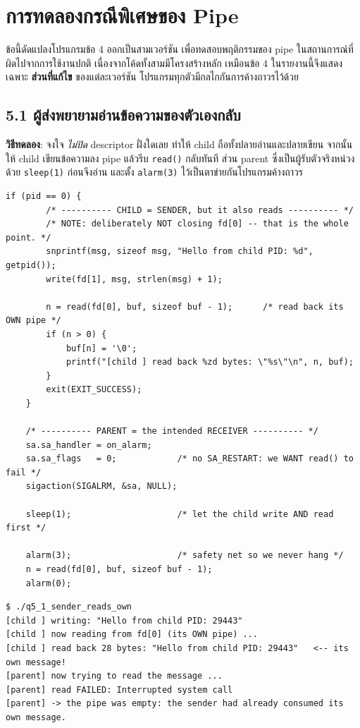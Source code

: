 \documentclass[a4paper,12pt]{article}
\newcommand{\code}[1]{\texttt{#1}}
\begin{document}
\section{การทดลองกรณีพิเศษของ Pipe}

ข้อนี้ดัดแปลงโปรแกรมข้อ 4 ออกเป็นสามเวอร์ชัน เพื่อทดสอบพฤติกรรมของ pipe
ในสถานการณ์ที่ผิดไปจากการใช้งานปกติ เนื่องจากโค้ดทั้งสามมีโครงสร้างหลัก
เหมือนข้อ 4 ในรายงานนี้จึงแสดงเฉพาะ \textbf{ส่วนที่แก้ไข} ของแต่ละเวอร์ชัน
โปรแกรมทุกตัวมีกลไกกันการค้างถาวรไว้ด้วย

\subsection{5.1 ผู้ส่งพยายามอ่านข้อความของตัวเองกลับ}

\textbf{วิธีทดลอง}: จงใจ \emph{ไม่ปิด} descriptor ฝั่งใดเลย ทำให้ child ถือทั้งปลายอ่านและปลายเขียน จากนั้นให้ child เขียนข้อความลง pipe แล้วรีบ \code{read()} กลับทันที ส่วน parent ซึ่งเป็นผู้รับตัวจริงหน่วงด้วย \code{sleep(1)} ก่อนจึงอ่าน และตั้ง \code{alarm(3)} ไว้เป็นตาข่ายกันโปรแกรมค้างถาวร

\begin{lstlisting}[caption={ส่วนของโค้ดที่แก้ไขในข้อ 5.1},label={lst:q5_1}]
    if (pid == 0) {
        /* ---------- CHILD = SENDER, but it also reads ---------- */
        /* NOTE: deliberately NOT closing fd[0] -- that is the whole point. */
        snprintf(msg, sizeof msg, "Hello from child PID: %d", getpid());
        write(fd[1], msg, strlen(msg) + 1);

        n = read(fd[0], buf, sizeof buf - 1);      /* read back its OWN pipe */
        if (n > 0) {
            buf[n] = '\0';
            printf("[child ] read back %zd bytes: \"%s\"\n", n, buf);
        }
        exit(EXIT_SUCCESS);
    }

    /* ---------- PARENT = the intended RECEIVER ---------- */
    sa.sa_handler = on_alarm;
    sa.sa_flags   = 0;            /* no SA_RESTART: we WANT read() to fail */
    sigaction(SIGALRM, &sa, NULL);

    sleep(1);                     /* let the child write AND read first */

    alarm(3);                     /* safety net so we never hang */
    n = read(fd[0], buf, sizeof buf - 1);
    alarm(0);
\end{lstlisting}

\begin{lstlisting}[style=terminal,caption={ผลลัพธ์ของข้อ 5.1}]
$ ./q5_1_sender_reads_own
[child ] writing: "Hello from child PID: 29443"
[child ] now reading from fd[0] (its OWN pipe) ...
[child ] read back 28 bytes: "Hello from child PID: 29443"   <-- its own message!
[parent] now trying to read the message ...
[parent] read FAILED: Interrupted system call
[parent] -> the pipe was empty: the sender had already consumed its own message.
\end{lstlisting}
\end{document}

